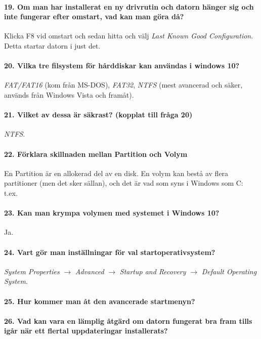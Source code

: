 \paragraph{19. Om man har installerat en ny drivrutin och datorn hänger sig och inte fungerar efter omstart, vad kan man göra då?} Klicka F8 vid omstart och sedan hitta och välj \textit{Last Known Good Configuration}. Detta startar datorn i just det.

\paragraph{20. Vilka tre filsystem för hårddiskar kan användas i windows 10?} \textit{FAT/FAT16} (kom från MS-DOS), \textit{FAT32}, \textit{NTFS} (mest avancerad och säker, används från Windows Vista och framåt).

\paragraph{21. Vilket av dessa är säkrast? (kopplat till fråga 20)} \textit{NTFS}.

\paragraph{22. Förklara skillnaden mellan Partition och Volym}
En Partition är en allokerad del av en disk. En volym kan bestå av flera partitioner (men det sker sällan), och det är vad som syns i Windows som C: t.ex.

\paragraph{23. Kan man krympa volymen med systemet i Windows 10?} Ja. 

\paragraph{24. Vart gör man inställningar för val startoperativsystem?}
\textit{System Properties} $\rightarrow$ \textit{Advanced} $\rightarrow$ \textit{Startup and Recovery} $\rightarrow$ \textit{Default Operating System}.

\paragraph{25. Hur kommer man åt den avancerade startmenyn?}


\paragraph{26. Vad kan vara en lämplig åtgärd om datorn fungerat bra fram tills igår när ett flertal uppdateringar installerats?}


